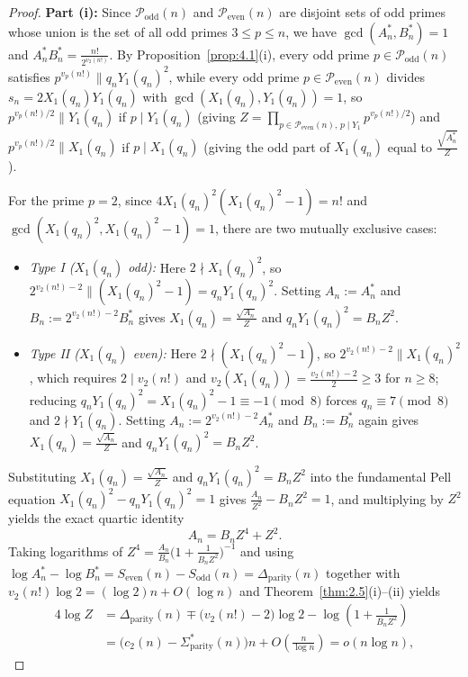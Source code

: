 \documentclass[11pt,reqno]{amsart}
\theoremstyle{remark}
\numberwithin{equation}{section}
\newcommand{\Podd}{\mathcal{P}_{\mathrm{odd}}}
\newcommand{\Peven}{\mathcal{P}_{\mathrm{even}}}
\newcommand{\Sodd}{S_{\mathrm{odd}}}
\newcommand{\Seven}{S_{\mathrm{even}}}
\newcommand{\Dparity}{\Delta_{\mathrm{parity}}}
\newcommand{\Sparitys}{\Sigma_{\mathrm{parity}}^*}
\begin{document}
\begin{proof}
\textbf{Part (i):} Since $\Podd(n)$ and $\Peven(n)$ are disjoint sets of odd primes whose union is the set of all odd primes $3 \le p \le n$, we have $\gcd(A_n^*, B_n^*) = 1$ and $A_n^* B_n^* = \frac{n!}{2^{v_2(n!)}}$. By Proposition~\ref{prop:4.1}(i), every odd prime $p \in \Podd(n)$ satisfies $p^{v_p(n!)} \parallel q_n Y_1(q_n)^2$, while every odd prime $p \in \Peven(n)$ divides $s_n = 2X_1(q_n)Y_1(q_n)$ with $\gcd(X_1(q_n), Y_1(q_n)) = 1$, so $p^{v_p(n!)/2} \parallel Y_1(q_n)$ if $p \mid Y_1(q_n)$ (giving $Z = \prod_{p \in \Peven(n),\, p \mid Y_1} p^{v_p(n!)/2}$) and $p^{v_p(n!)/2} \parallel X_1(q_n)$ if $p \mid X_1(q_n)$ (giving the odd part of $X_1(q_n)$ equal to $\frac{\sqrt{A_n^*}}{Z}$).

For the prime $p = 2$, since $4X_1(q_n)^2(X_1(q_n)^2 - 1) = n!$ and $\gcd(X_1(q_n)^2, X_1(q_n)^2 - 1) = 1$, there are two mutually exclusive cases:
\begin{itemize}
\item \emph{Type I ($X_1(q_n)$ odd):} Here $2 \nmid X_1(q_n)^2$, so $2^{v_2(n!)-2} \parallel (X_1(q_n)^2 - 1) = q_n Y_1(q_n)^2$. Setting $A_n := A_n^*$ and $B_n := 2^{v_2(n!)-2} B_n^*$ gives $X_1(q_n) = \frac{\sqrt{A_n}}{Z}$ and $q_n Y_1(q_n)^2 = B_n Z^2$.
\item \emph{Type II ($X_1(q_n)$ even):} Here $2 \nmid (X_1(q_n)^2 - 1)$, so $2^{v_2(n!)-2} \parallel X_1(q_n)^2$, which requires $2 \mid v_2(n!)$ and $v_2(X_1(q_n)) = \frac{v_2(n!)-2}{2} \ge 3$ for $n \ge 8$; reducing $q_n Y_1(q_n)^2 = X_1(q_n)^2 - 1 \equiv -1 \pmod 8$ forces $q_n \equiv 7 \pmod 8$ and $2 \nmid Y_1(q_n)$. Setting $A_n := 2^{v_2(n!)-2} A_n^*$ and $B_n := B_n^*$ again gives $X_1(q_n) = \frac{\sqrt{A_n}}{Z}$ and $q_n Y_1(q_n)^2 = B_n Z^2$.
\end{itemize}
Substituting $X_1(q_n) = \frac{\sqrt{A_n}}{Z}$ and $q_n Y_1(q_n)^2 = B_n Z^2$ into the fundamental Pell equation $X_1(q_n)^2 - q_n Y_1(q_n)^2 = 1$ gives $\frac{A_n}{Z^2} - B_n Z^2 = 1$, and multiplying by $Z^2$ yields the exact quartic identity
\[
A_n = B_n Z^4 + Z^2.
\]
Taking logarithms of $Z^4 = \frac{A_n}{B_n}\bigl(1 + \frac{1}{B_n Z^2}\bigr)^{-1}$ and using $\log A_n^* - \log B_n^* = \Seven(n) - \Sodd(n) = \Dparity(n)$ together with $v_2(n!)\log 2 = (\log 2)n + O(\log n)$ and Theorem~\ref{thm:2.5}(i)--(ii) yields
\begin{align*}
4\log Z &= \Dparity(n) \mp \bigl(v_2(n!) - 2\bigr)\log 2 - \log\!\left(1 + \frac{1}{B_n Z^2}\right) \\
&= \bigl(c_2(n) - \Sparitys(n)\bigr)n + O\!\left(\frac{n}{\log n}\right) = o(n\log n),

\end{align*}
\end{proof}
\end{document}
